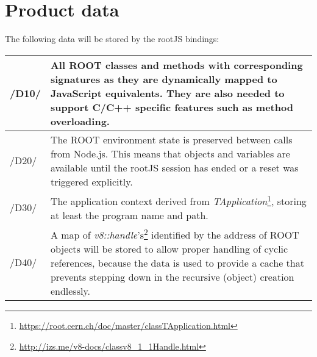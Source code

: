 \chapter{Product data}

The following data will be stored by the rootJS bindings: \\

\begin{longtable}{|p{1cm} | p{15cm}|}
\hline
/D10/ & All ROOT classes and methods with corresponding signatures as they are dynamically mapped to JavaScript equivalents. They are also needed to support C/C++ specific features such as method overloading.\\
\hline
/D20/ & The ROOT environment state is preserved between calls from Node.js. This means that objects and variables are available until the rootJS session has ended or a reset was triggered explicitly.\\
\hline
/D30/ & The application context derived from \textit{TApplication}\footnote{\url{https://root.cern.ch/doc/master/classTApplication.html}}, storing at least the program name and path.\\
\hline
/D40/ & A map of \textit{v8::handle}'s\footnote{\url{http://izs.me/v8-docs/classv8_1_1Handle.html}} identified by the address of ROOT objects will be stored to allow proper handling of cyclic references, because the data is used to provide a cache that prevents stepping down in the recursive (object) creation endlessly.\\
\hline
\end{longtable}
